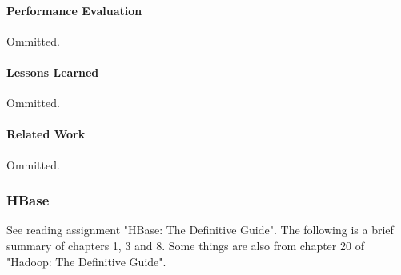 \paragraph{Performance Evaluation}
Ommitted.

\paragraph{Lessons Learned}
Ommitted.

\paragraph{Related Work}
Ommitted.




\subsubsection{HBase}

See reading assignment "HBase: The Definitive Guide". The following is a brief summary of chapters 1, 3 and 8. Some things are also from chapter 20 of "Hadoop: The Definitive Guide".

